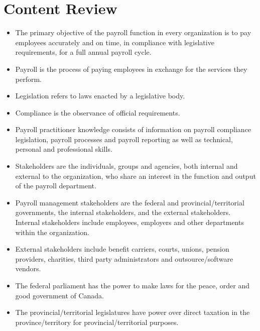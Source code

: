 \documentclass[letterpaper,10pt,english]{sphinxmanual}
\begin{document}
\chapter{Content Review}
\label{\detokenize{1_introduction:content-review}}\begin{itemize}
\item {} 
\sphinxAtStartPar
The primary objective of the payroll function in every organization is to pay employees accurately and on time, in compliance with legislative requirements, for a full annual payroll cycle.

\item {} 
\sphinxAtStartPar
Payroll is the process of paying employees in exchange for the services they perform.

\item {} 
\sphinxAtStartPar
Legislation refers to laws enacted by a legislative body.

\item {} 
\sphinxAtStartPar
Compliance is the observance of official requirements.

\item {} 
\sphinxAtStartPar
Payroll practitioner knowledge consists of information on payroll compliance legislation, payroll processes and payroll reporting as well as technical, personal and professional skills.

\item {} 
\sphinxAtStartPar
Stakeholders are the individuals, groups and agencies, both internal and external to the organization, who share an interest in the function and output of the payroll department.

\item {} 
\sphinxAtStartPar
Payroll management stakeholders are the federal and provincial/territorial governments, the internal stakeholders, and the external stakeholders. Internal stakeholders include employees, employers and other departments within the organization.

\item {} 
\sphinxAtStartPar
External stakeholders include benefit carriers, courts, unions, pension providers, charities, third party administrators and outsource/software vendors.

\item {} 
\sphinxAtStartPar
The federal parliament has the power to make laws for the peace, order and good government of Canada.

\item {} 
\sphinxAtStartPar
The provincial/territorial legislatures have power over direct taxation in the province/territory for provincial/territorial purposes.


\end{itemize}
\end{document}
